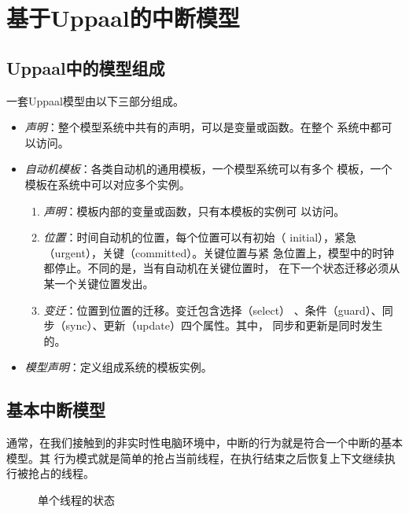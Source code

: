 
\chapter{基于Uppaal的中断模型}
\label{cha:intr}

\section{Uppaal中的模型组成}
\label{sec:model_combine}	
一套Uppaal模型由以下三部分组成。
\begin{itemize}
	\item \emph{声明}：整个模型系统中共有的声明，可以是变量或函数。在整个
	系统中都可以访问。
	\item \emph{自动机模板}：各类自动机的通用模板，一个模型系统可以有多个
	模板，一个模板在系统中可以对应多个实例。
		\begin{enumerate}[(1)]
			\item \emph{声明}：模板内部的变量或函数，只有本模板的实例可
			以访问。
			\item \emph{位置}：时间自动机的位置，每个位置可以有初始（
			initial），紧急（urgent），关键（committed）。关键位置与紧
			急位置上，模型中的时钟都停止。不同的是，当有自动机在关键位置时，
			在下一个状态迁移必须从某一个关键位置发出。
			\item \emph{变迁}：位置到位置的迁移。变迁包含选择（select）
			、条件（guard）、同步（sync）、更新（update）四个属性。其中，
			同步和更新是同时发生的。
		\end{enumerate}	
	\item \emph{模型声明}：定义组成系统的模板实例。
\end{itemize}

\section{基本中断模型}
\label{sec:basic}
通常，在我们接触到的非实时性电脑环境中，中断的行为就是符合一个中断的基本模型。其
行为模式就是简单的抢占当前线程，在执行结束之后恢复上下文继续执行被抢占的线程。

\begin{figure}[H]
	\centering
	
	\caption{单个线程的状态}
	\label{fig:thread_state}
\end{figure}

